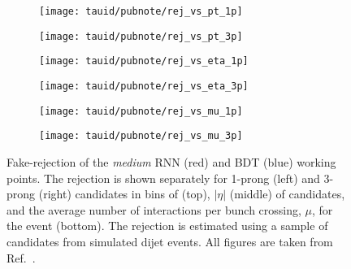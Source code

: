 \begin{figure}[htbp]

  \begin{subfigure}{0.498\textwidth}
    \texttt{[image: tauid/pubnote/rej\_vs\_pt\_1p]}
    \subcaption{}%
    \label{fig:tauid_faketau_rej_a}
  \end{subfigure}\hfill%
  \begin{subfigure}{0.498\textwidth}
    \texttt{[image: tauid/pubnote/rej\_vs\_pt\_3p]}
    \subcaption{}%
    \label{fig:tauid_faketau_rej_b}
  \end{subfigure}

  \begin{subfigure}{0.498\textwidth}
    \texttt{[image: tauid/pubnote/rej\_vs\_eta\_1p]}
    \subcaption{}
  \end{subfigure}\hfill%
  \begin{subfigure}{0.498\textwidth}
    \texttt{[image: tauid/pubnote/rej\_vs\_eta\_3p]}
    \subcaption{}
  \end{subfigure}

  \begin{subfigure}{0.498\textwidth}
    \texttt{[image: tauid/pubnote/rej\_vs\_mu\_1p]}
    \subcaption{}%
    \label{fig:tauid_faketau_rej_e}
  \end{subfigure}\hfill%
  \begin{subfigure}{0.498\textwidth}
    \texttt{[image: tauid/pubnote/rej\_vs\_mu\_3p]}
    \subcaption{}%
    \label{fig:tauid_faketau_rej_f}
  \end{subfigure}

  \caption[Fake-\tauhadvis rejection of the \emph{medium} RNN and BDT \tauid
  working points.]{Fake-\tauhadvis rejection of the \emph{medium} RNN (red) and
    BDT (blue) \tauid working points. The rejection is shown separately for
    1-prong (left) and 3-prong (right) \tauhadvis candidates in bins of \pT
    (top), $|\eta|$ (middle) of \tauhadvis candidates, and the average number of
    interactions per bunch crossing, $\mu$, for the event (bottom). The
    rejection is estimated using a sample of \tauhadvis candidates from
    simulated dijet events. All figures are taken from
    Ref.~\cite{ATL-PHYS-PUB-2019-033}.}%
  \label{fig:tauid_faketau_rej}
\end{figure}

